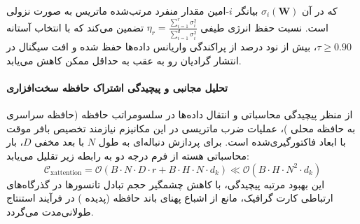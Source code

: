 

که در آن $\sigma_i(\mathbf{W})$ بیانگر $i$-امین مقدار منفرد مرتب‌شده ماتریس به صورت نزولی است. نسبت حفظ انرژی طیفی $\eta_r = \frac{\sum_{i=1}^r \sigma_i^2}{\sum_{i=1}^{d} \sigma_i^2}$ تضمین می‌کند که با انتخاب آستانه $\tau \ge 0.90$، بیش از نود درصد از پراکندگی واریانس داده‌ها حفظ شده و افت سیگنال در انتشار گرادیان رو به عقب به حداقل ممکن کاهش می‌یابد.

\paragraph{تحلیل مجانبی و پیچیدگی اشتراک حافظه سخت‌افزاری}
از منظر پیچیدگی محاسباتی و انتقال داده‌ها در سلسومراتب حافظه (حافظه سراسری  به حافظه محلی )، عملیات ضرب ماتریسی در این مکانیزم نیازمند تخصیص بافر موقت با ابعاد فاکتورگیری‌شده است. برای پردازش دنباله‌ای به طول $N$ با بعد مخفی $D$، بار محاسباتی هسته از فرم درجه دو به رابطه زیر تقلیل می‌یابد:
\begin{equation}
\label{eq:complexity_xattention}
\mathcal{C}_{\text{xattention}} = \mathcal{O}\left( B \cdot N \cdot D \cdot r + B \cdot H \cdot N \cdot d_k \right) \ll \mathcal{O}\left( B \cdot H \cdot N^2 \cdot d_k \right)
\end{equation}
این بهبود مرتبه پیچیدگی، با کاهش چشمگیر حجم تبادل تانسورها در گذرگاه‌های ارتباطی کارت گرافیک، مانع از اشباع پهنای باند حافظه (پدیده ) در فرآیند استنتاج طولانی‌مدت می‌گردد.
